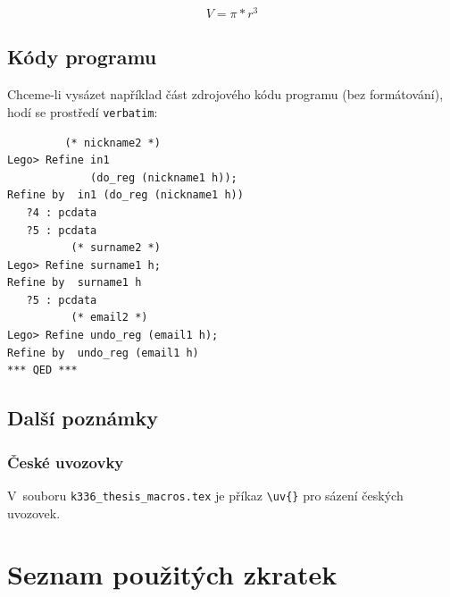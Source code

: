 \documentclass[11pt,twoside,a4paper]{book}
\begin{document}
\begin{equation}
  V = \pi * r^3
\end{equation}

\section{Kódy programu}
Chceme-li vysázet například část zdrojového kódu programu (bez formátování), hodí se prostředí \verb|verbatim|: 
\begin{verbatim}
         (* nickname2 *)
Lego> Refine in1
             (do_reg (nickname1 h));
Refine by  in1 (do_reg (nickname1 h))
   ?4 : pcdata
   ?5 : pcdata
          (* surname2 *)
Lego> Refine surname1 h;
Refine by  surname1 h
   ?5 : pcdata
          (* email2 *)
Lego> Refine undo_reg (email1 h);
Refine by  undo_reg (email1 h)
*** QED ***
\end{verbatim}

\section{Další poznámky}
\subsection{České uvozovky}
V~souboru \verb|k336_thesis_macros.tex| je příkaz \verb|\uv{}| pro sázení českých uvozovek. 


\chapter{Seznam použitých zkratek}
\end{document}

